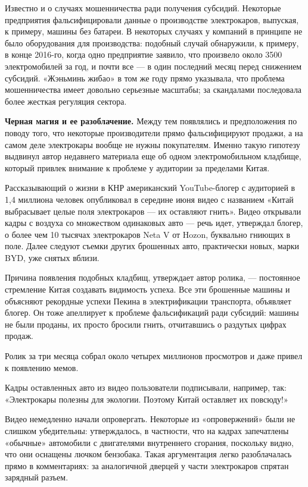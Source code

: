 Известно и о случаях мошенничества ради получения субсидий. Некоторые предприятия фальсифицировали данные о производстве электрокаров, выпуская, к примеру, машины без батареи. В некоторых случаях у компаний в принципе не было оборудования для производства: подобный случай обнаружили, к примеру, в конце 2016-го, когда одно предприятие заявило, что произвело около 3500 электромобилей за год, и почти все — в один последний месяц перед снижением субсидий. «Жэньминь жибао» в том же году прямо указывала, что проблема мошенничества имеет довольно серьезные масштабы; за скандалами последовала более жесткая регуляция сектора.

\textbf{Черная магия и ее разоблачение.} Между тем появлялись и предположения по поводу того, что некоторые производители прямо фальсифицируют продажи, а на самом деле электрокары вообще не нужны покупателям. Именно такую гипотезу выдвинул автор недавнего материала еще об одном электромобильном кладбище, который привлек внимание к проблеме у аудитории за пределами Китая.

Рассказывающий о жизни в КНР американский YouTube-блогер с аудиторией в 1,4 миллиона человек опубликовал в середине июня видео с названием «Китай выбрасывает целые поля электрокаров — их оставляют гнить». Видео открывали кадры с воздуха со множеством одинаковых авто — речь идет, утверждал блогер, о более чем 10 тысячах электрокаров Neta V от Hozon, буквально гниющих в поле. Далее следуют съемки других брошенных авто, практически новых, марки BYD, уже снятых вблизи.

Причина появления подобных кладбищ, утверждает автор ролика, — постоянное стремление Китая создавать видимость успеха. Все эти брошенные машины и объясняют рекордные успехи Пекина в электрификации транспорта, объявляет блогер. Он тоже апеллирует к проблеме фальсификаций ради субсидий: машины не были проданы, их просто бросили гнить, отчитавшись о раздутых цифрах продаж.

Ролик за три месяца собрал около четырех миллионов просмотров и даже привел к появлению мемов.


\vspace*{1em}
\begin{center}
    {\Large Кадры оставленных авто из видео пользователи подписывали, например, так: «Электрокары полезны для экологии. Поэтому Китай оставляет их повсюду!»}
\end{center}
\vspace*{1em}

Видео немедленно начали опровергать. Некоторые из «опровержений» были не слишком убедительны: утверждалось, в частности, что на кадрах запечатлены «обычные» автомобили с двигателями внутреннего сгорания, поскольку видно, что они оснащены лючком бензобака. Такая аргументация легко разоблачалась прямо в комментариях: за аналогичной дверцей у части электрокаров спрятан зарядный разъем.

